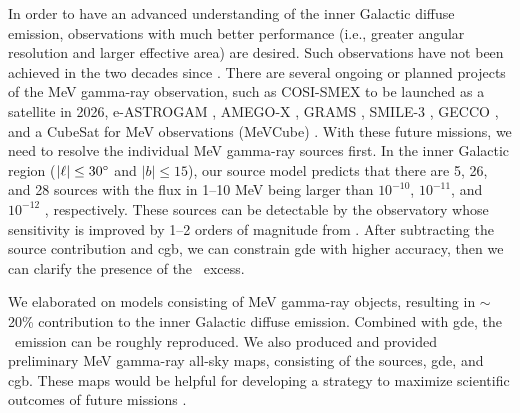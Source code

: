 \documentclass[a4paper,11pt]{article}
\begin{document}
In order to have an advanced understanding of the inner Galactic diffuse emission, observations with much better performance (i.e., greater angular resolution and larger effective area) are desired. 
Such observations have not been achieved in the two decades since \comptel.
There are several ongoing or planned projects of the MeV gamma-ray observation,
such as COSI-SMEX \citep{COSI_SMEX} to be launched as a satellite in 2026,
e-ASTROGAM \citep{eASTROGAM2018}, AMEGO-X \citep{fleischhack_amego-x_2021}, GRAMS \citep{Aramaki2020}, SMILE-3 \citep{takada_first_2022}, GECCO \citep{moiseev_new_2021}, and a CubeSat for MeV observations (MeVCube) \citep{lucchetta_introducing_2022}.
With these future missions, we need to resolve the individual MeV gamma-ray sources first.
In the inner Galactic region ($|\ell| \leq 30\hbox{$^\circ$}$ and $|b| \leq 15$\degr), our source model predicts that there are 5, 26, and 28 sources with the flux in 1--10 MeV being larger than
$10^{-10}$, $10^{-11}$, and $10^{-12}$ \flux, respectively.
These sources can be detectable by the observatory whose sensitivity is improved by 1--2 orders of magnitude from \comptel.
After subtracting the source contribution and \ac{cgb}, we can constrain \ac{gde} with higher accuracy, %
then we can clarify the presence of the \comptel\ excess.
\fi


We elaborated on models consisting of MeV gamma-ray objects, resulting in $\sim$20\% contribution to the inner Galactic diffuse emission. Combined with \ac{gde}, the \comptel\ emission can be roughly reproduced. 
We also produced and provided preliminary MeV gamma-ray all-sky maps, consisting of the sources, \ac{gde}, and \ac{cgb}.
These maps would be helpful for developing a strategy to maximize scientific outcomes of future missions \cite{COSI_SMEX,fleischhack_amego-x_2021,Aramaki2020,takada_first_2022}.
\fi
\end{document}
